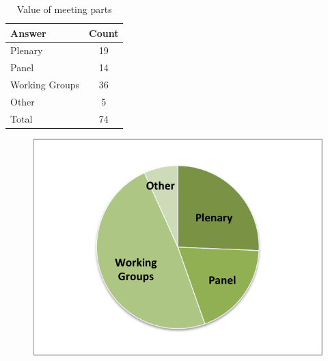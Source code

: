 
\begin{table}[h!]
\centering
\caption{Value of meeting parts}
\label{tab:survey_parts}
\begin{tabular}{|l|c|}
\hline
{\bf Answer} &
{\bf Count} \\ \hline
Plenary &
19 \\
Panel &
14 \\
Working Groups &
36 \\
Other &
5 \\
Total &
74 \\
\hline
\end{tabular}
\end{table}
\begin{figure}[h]
\includegraphics{SurveyFig4}
\label{fig:SFig4}
\end{figure}


